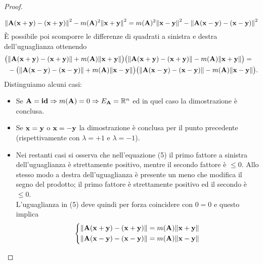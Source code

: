 \documentclass[a4paper,11pt,openright,twoside	]{book}
\begin{document}
\begin{proof}
\begin{itemize}
\[ \norm{\vb{A(x+y) - (x+y)}}^2 - m(\vb{A})^2 \norm{\vb{x+y}}^2=  m(\vb{A})^2 \norm{\vb{x-y}}^2 - \norm{\vb{A(x-y) - (x-y)}}^2 \]
\`E possibile poi scomporre le differenze di quadrati a sinistra e destra dell'uguaglianza ottenendo
\begin{equation} 
\begin{split}
\big( & \norm{\vb{A(x+y) - (x+y)}}  + m(\vb{A})\norm{\vb{x+y}} \big) \big( \norm{\vb{A(x+y) - (x+y)}} - m(\vb{A}) \norm{\vb{x+y}} \big) = \\
& -\big( \norm{\vb{A(x-y) - (x-y)}} + m(\vb{A})\norm{\vb{x-y}} \big) \big( \norm{\vb{A(x-y) - (x-y)}} - m(\vb{A}) \norm{\vb{x-y}} \big).
\end{split}
\end{equation}
Distinguiamo alcuni casi: 
\begin{itemize}
\item Se $\vb{A} = \vb{id} \Rightarrow m(\vb{A}) = 0 \Rightarrow E_{\vb{A}} = \mathbb{R}^{n}$  ed in quel caso la dimostrazione è conclusa.
\item Se $\vb{x} = \vb{y}$ o $\vb{x} = \vb{-y}$  la dimostrazione è conclusa per il punto precedente (rispettivamente con $\lambda = +1$ e $\lambda = -1$). 
\item Nei restanti casi si osserva che nell'equazione (5) il primo fattore a sinistra dell'uguaglianza è strettamente positivo, mentre il secondo fattore è $\leq 0 $. Allo stesso modo a destra dell'uguaglianza è presente un meno che modifica il segno del prodotto; il primo fattore è strettamente positivo ed il secondo è $\leq 0 $. \\ L'uguaglianza in (5) deve quindi per forza coincidere con $0=0$ e questo implica 
\begin{equation*}
  \left\{
    \begin{aligned}
      & \norm{\vb{A(x+y) - (x+y)}} = m(\vb{A})\norm{\vb{x+y}} \\
      & \norm{\vb{A(x-y) - (x-y)}} = m(\vb{A})\norm{\vb{x-y}} 
    \end{aligned}
  \right.
\end{equation*}


\end{itemize}
\end{itemize}
\end{proof}
\end{document}
